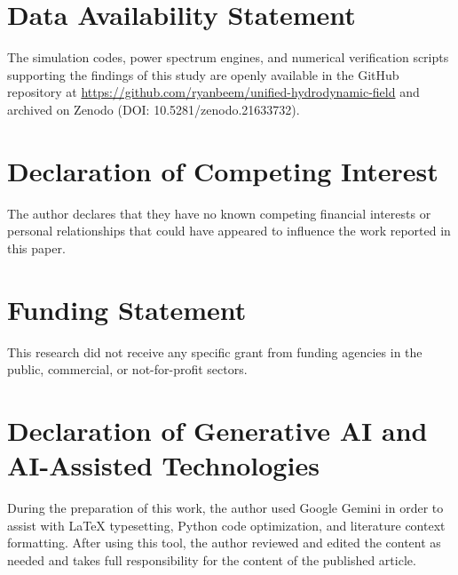 \documentclass[11pt,a4paper]{article}
\begin{document}
	\section*{Data Availability Statement}
	The simulation codes, power spectrum engines, and numerical verification scripts supporting the findings of this study are openly available in the GitHub repository at \url{https://github.com/ryanbeem/unified-hydrodynamic-field} and archived on Zenodo (DOI: 10.5281/zenodo.21633732).
	
	\section*{Declaration of Competing Interest}
	The author declares that they have no known competing financial interests or personal relationships that could have appeared to influence the work reported in this paper.
	
	\section*{Funding Statement}
	This research did not receive any specific grant from funding agencies in the public, commercial, or not-for-profit sectors.
	
	\section*{Declaration of Generative AI and AI-Assisted Technologies}
	During the preparation of this work, the author used Google Gemini in order to assist with LaTeX typesetting, Python code optimization, and literature context formatting. After using this tool, the author reviewed and edited the content as needed and takes full responsibility for the content of the published article.
	
\end{document}
